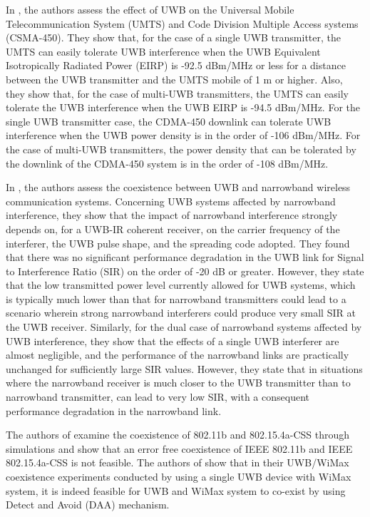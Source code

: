 In \cite{ahmed2008impact}, the authors assess the effect of UWB on the Universal Mobile Telecommunication System (UMTS) and Code Division Multiple Access systems (CSMA-450). They show that, for the case of a single UWB transmitter, the UMTS can easily tolerate UWB interference when the UWB Equivalent Isotropically Radiated Power (EIRP) is -92.5 dBm/MHz or less for a distance between the UWB transmitter and the UMTS mobile of 1 m or higher. Also, they show that, for the case of multi-UWB transmitters, the UMTS can easily tolerate the UWB interference when the UWB EIRP is -94.5 dBm/MHz. For the single UWB transmitter case, the CDMA-450 downlink can tolerate UWB interference when the UWB power density is in the order of -106 dBm/MHz. For the case of multi-UWB transmitters, the power density that can be tolerated by the downlink of the CDMA-450 system is in the order of -108 dBm/MHz.

In \cite{chiani2009coexistence}, the authors assess the coexistence between UWB and narrowband wireless communication systems. Concerning UWB systems affected by narrowband interference, they show that the impact of narrowband interference strongly depends on, for a UWB-IR coherent receiver, on the carrier frequency of the interferer, the UWB pulse shape, and the spreading code adopted. They found that there was no significant performance degradation in the UWB link for Signal to Interference Ratio (SIR) on the order of -20 dB or greater. However, they state that the low transmitted power level currently allowed for UWB systems, which is typically much lower than that for narrowband transmitters could lead to a scenario wherein strong narrowband interferers could produce very small SIR at the UWB receiver. Similarly, for the dual case of narrowband systems affected by UWB interference, they show that the effects of a single UWB interferer are almost negligible, and the performance of the narrowband links are practically unchanged for sufficiently large SIR values. However, they state that in situations where the narrowband receiver is much closer to the UWB transmitter than to narrowband transmitter, can lead to very low SIR, with a consequent performance degradation in the narrowband link.

The authors of \cite{lewandowski2010coexistence} examine the coexistence of 802.11b and 802.15.4a-CSS through simulations and show that an error free coexistence of IEEE 802.11b and IEEE 802.15.4a-CSS is not feasible. The authors of \cite{mishra2007detect} show that in their UWB/WiMax coexistence experiments conducted by using a single UWB device with WiMax system, it is indeed feasible for UWB and WiMax system to co-exist by using Detect and Avoid (DAA) mechanism.

